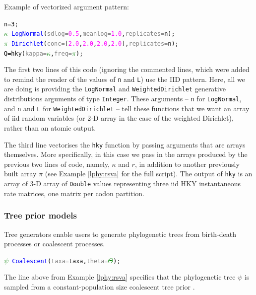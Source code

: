 \documentclass[10pt,letterpaper,table]{article}
\begin{document}
Example of vectorized argument pattern: 
{\singlespacing
\begin{alltt}
  n = 3;
  \textcolor{green}{\(\kappa\)} ~ \textcolor{blue}{LogNormal}(\textcolor{gray}{sdlog=}\textcolor{magenta}{0.5}, \textcolor{gray}{meanlog=}\textcolor{magenta}{1.0}, \textcolor{gray}{replicates=}n);
  \textcolor{green}{\(\pi\)} ~ \textcolor{blue}{Dirichlet}(\textcolor{gray}{conc=}[\textcolor{magenta}{2.0}, \textcolor{magenta}{2.0}, \textcolor{magenta}{2.0}, \textcolor{magenta}{2.0}], \textcolor{gray}{replicates=}n);
  \textcolor{black}{Q = }\textcolor{magenta!80!black}{hky}(\textcolor{gray}{kappa=}\textcolor{green}{\(\kappa\)}, \textcolor{gray}{freq=}\textcolor{green}{\(\pi\)});
\end{alltt} 

The first two lines of this code (ignoring the commented lines, which
were added to remind the reader of the values of \texttt{n} and
\texttt{L}) use the IID pattern.
Here, all we are doing is providing the \texttt{LogNormal} and
\texttt{WeightedDirichlet} generative distributions arguments of
type \texttt{Integer}.
These arguments -- \texttt{n} for \texttt{LogNormal}, and \texttt{n}
and \texttt{L} for \texttt{WeightedDirichlet} -- tell these functions
that we want an array of iid random variables (or 2-D array in the
case of the weighted Dirichlet), rather than an atomic output. 

The third line vectorises the \texttt{hky} function by passing
arguments that are arrays themselves.
More specifically, in this case we pass in the arrays produced by the
previous two lines of code, namely, \texttt{$\kappa$} and
\texttt{$r$}, in addition to another previously built array
\texttt{$\pi$} (see Example \ref{lphy:rsva} for the full script).
The output of \texttt{hky} is an array of 3-D array of \texttt{Double}
values representing three iid HKY \cite{hky} instantaneous rate
matrices, one matrix per codon partition.


\subsubsection{Tree prior models}
Tree generators enable users to generate phylogenetic trees from birth-death processes or coalescent processes. 
{\small
  \begin{alltt}
    \textcolor{green}{\(\psi\)} ~ \textcolor{blue}{Coalescent}(\textcolor{gray}{taxa=}taxa, \textcolor{gray}{theta=}\textcolor{green}{\(\Theta\)});
  \end{alltt}
}
The line above from Example \ref{lphy:rsva} specifies that the
phylogenetic tree \texttt{$\psi$} is sampled from a
constant-population size coalescent tree prior \cite{kingman82}.
\newline 

}
\end{document}
